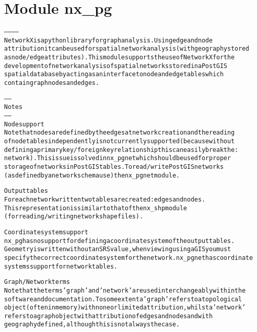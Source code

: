 %
%
%


\section{Module nx\_pg}

    \label{nx_pg}
\begin{alltt}

------------
NetworkX is a python library for graph analysis. Using edge and node 
attribution it can be used for spatial network analysis (with geography stored 
as node/edge attributes). This module supports the use of NetworkX for the
development of network analysis of spatial networks stored in a PostGIS 
spatial database by acting as an interface to node and edge tables which 
contain graph nodes and edges.

-----
Notes
-----
Node support
Note that nodes are defined by the edges at network creation and the reading 
of node tables independently is not currently supported (because without 
defining a primary key/foreign key relationship this can easily break the :
network). This issue is solved in nx\_pgnet which should be used for proper
storage of networks in PostGIS tables. To read/write PostGIS networks 
(as defined by a network schema use) the nx\_pgnet module.

Output tables
For each network written two tables are created: edges and nodes. 
This representation is similar to that of the nx\_shp module 
(for reading/writing network shapefiles). 

Coordinate system support
nx\_pg has no support for defining a coordinate system of the output tables. 
Geometry is written without an SRS value, when viewing using a GIS you must
specify the correct coordinate system for the network. nx\_pgnet has coordinate
systems support for network tables.

Graph/Network terms
Note that the terms 'graph' and 'network' are used interchangeably within the 
software and documentation. To some extent a 'graph' refers to a topological 
object (often in memory) with none or limited attribution, whilst a 'network' 
refers to a graph object with attribution of edges and nodes and with 
geography defined, although this is not always the case.


\end{alltt}

